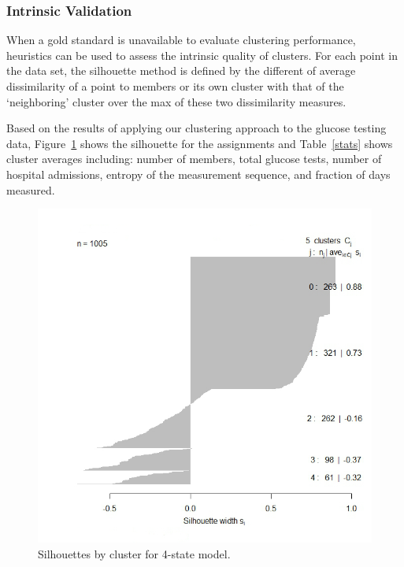 \subsubsection{Intrinsic Validation}
When a gold standard is unavailable to evaluate clustering performance, heuristics can be used to assess the intrinsic quality of clusters.  For each point in the data set, the silhouette method is defined by the different of average dissimilarity of a point to members or its own cluster with that of the `neighboring' cluster over the max of these two dissimilarity measures.

Based on the results of applying our clustering approach to the glucose testing data, Figure~\ref{sil} shows the silhouette for the assignments and Table~\ref{stats} shows cluster averages including: number of members, total glucose tests, number of hospital admissions, entropy of the measurement sequence, and fraction of days measured.

\begin{figure}[t]
\begin{center}
\centerline{\includegraphics[width=\columnwidth]{fig/sil.jpeg}}
\caption{Silhouettes by cluster for 4-state model.}
\label{sil}
\end{center}
\vskip -0.2in
\end{figure}


